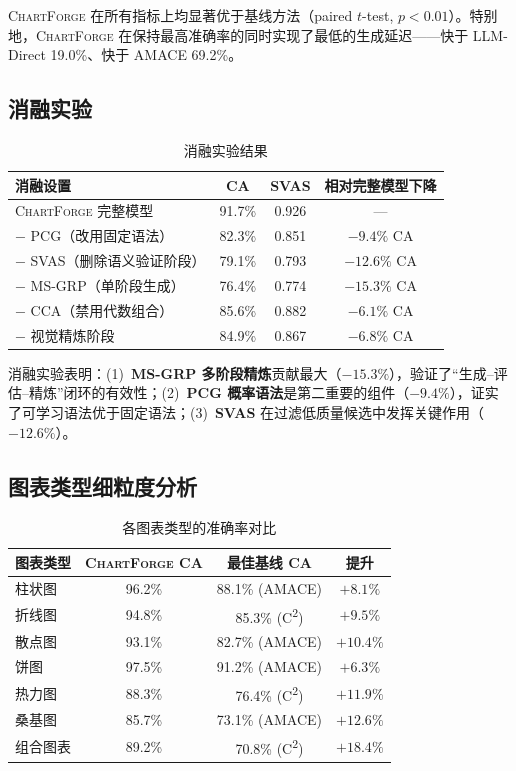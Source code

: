 \documentclass[12pt,a4paper]{ctexart}
\theoremstyle{remark}
\newcommand{\ChartForge}{\textsc{ChartForge}}
\begin{document}
\ChartForge{} 在所有指标上均显著优于基线方法（paired $t$-test, $p < 0.01$）。特别地，\ChartForge{} 在保持最高准确率的同时实现了最低的生成延迟——快于 LLM-Direct 19.0\%、快于 AMACE 69.2\%。

\subsection{消融实验}

\begin{table}[H]
\centering
\caption{消融实验结果}
\label{tab:ablation}
\begin{tabular}{l|c|c|c}
\toprule
\textbf{消融设置} & \textbf{CA} & \textbf{SVAS} & \textbf{相对完整模型下降} \\
\midrule
\ChartForge{} 完整模型 & 91.7\% & 0.926 & — \\
$-$ PCG（改用固定语法）& 82.3\% & 0.851 & $-9.4\%$ CA \\
$-$ SVAS（删除语义验证阶段）& 79.1\% & 0.793 & $-12.6\%$ CA \\
$-$ MS-GRP（单阶段生成）& 76.4\% & 0.774 & $-15.3\%$ CA \\
$-$ CCA（禁用代数组合）& 85.6\% & 0.882 & $-6.1\%$ CA \\
$-$ 视觉精炼阶段 & 84.9\% & 0.867 & $-6.8\%$ CA \\
\bottomrule
\end{tabular}
\end{table}

消融实验表明：(1)~\textbf{MS-GRP 多阶段精炼}贡献最大（$-15.3\%$），验证了“生成--评估--精炼”闭环的有效性；(2)~\textbf{PCG 概率语法}是第二重要的组件（$-9.4\%$），证实了可学习语法优于固定语法；(3)~\textbf{SVAS} 在过滤低质量候选中发挥关键作用（$-12.6\%$）。

\subsection{图表类型细粒度分析}

\begin{table}[H]
\centering
\caption{各图表类型的准确率对比}
\label{tab:fine}
\begin{tabular}{l|c|c|c}
\toprule
\textbf{图表类型} & \textbf{\ChartForge{} CA} & \textbf{最佳基线 CA} & \textbf{提升} \\
\midrule
柱状图 & 96.2\% & 88.1\% (AMACE) & $+8.1\%$ \\
折线图 & 94.8\% & 85.3\% (C\textsuperscript{2}) & $+9.5\%$ \\
散点图 & 93.1\% & 82.7\% (AMACE) & $+10.4\%$ \\
饼图   & 97.5\% & 91.2\% (AMACE) & $+6.3\%$ \\
热力图 & 88.3\% & 76.4\% (C\textsuperscript{2}) & $+11.9\%$ \\
桑基图 & 85.7\% & 73.1\% (AMACE) & $+12.6\%$ \\
组合图表 & 89.2\% & 70.8\% (C\textsuperscript{2}) & $+18.4\%$ \\
\bottomrule
\end{tabular}
\end{table}
\end{document}
